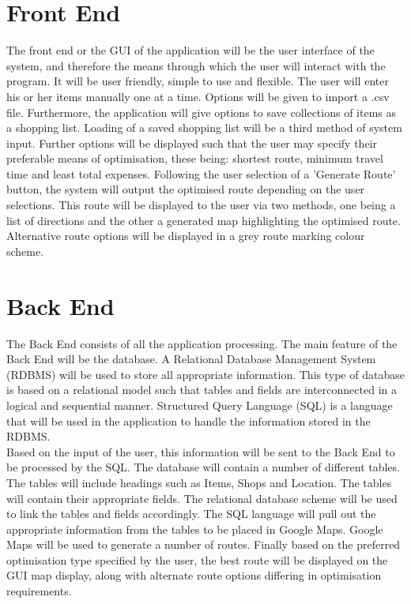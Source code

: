 \documentclass[10pt, a4paper, onecolumn]{scrartcl}
\begin{document}
	\section{Front End}
		
		The front end or the GUI of the application will be the user interface of the system, and therefore the means through which the user will interact with the program. It will be user friendly, simple to use and flexible. The user will enter his or her items manually one at a time. Options will be given to import a .csv file. Furthermore, the application will give options to save collections of items as a shopping list. Loading of a saved shopping list will be a third method of system input. Further options will be displayed such that the user may specify their preferable means of optimisation, these being: shortest route, minimum travel time and least total expenses. Following the user selection of a 'Generate Route' button, the system will output the optimised route depending on the user selections. This route will be displayed to the user via two methods, one being a list of directions and the other a generated map highlighting the optimised route. Alternative route options will be displayed in a grey route marking colour scheme.  
	
	\section{Back End}
	
	The Back End consists of all the application processing. The main feature of the Back End will be the database. A Relational Database Management System (RDBMS) will be used to store all appropriate information. This type of database is based on a relational model such that tables and fields are interconnected in a logical and sequential manner. Structured Query Language (SQL) is a language that will be used in the application to handle the information stored in the RDBMS. \\
	
	Based on the input of the user, this information will be sent to the Back End to be processed by the SQL. The database will contain a number of different tables. The tables will include headings such as Items,  Shops and Location. The tables will contain their appropriate fields. The relational database scheme will be used to link the tables and fields accordingly. The SQL language will pull out the appropriate information from the tables to be placed in Google Maps. Google Maps will be used to generate a number of routes. Finally based on the preferred optimisation type specified by the user, the best route will be displayed on the GUI map display, along with alternate route options differing in optimisation requirements. 
	
\end{document}
